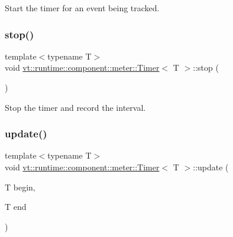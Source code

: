 Start the timer for an event being tracked. 

\mbox{\label{structvt_1_1runtime_1_1component_1_1meter_1_1_timer_a302a9e413a1188b3a30ece1905123249}} 
\subsubsection{\texorpdfstring{stop()}{stop()}}
{\footnotesize\ttfamily template$<$typename T$>$ \\
void \hyperlink{structvt_1_1runtime_1_1component_1_1meter_1_1_timer}{vt\+::runtime\+::component\+::meter\+::\+Timer}$<$ T $>$\+::stop (\begin{DoxyParamCaption}{ }\end{DoxyParamCaption})\hspace{0.3cm}{\ttfamily [inline]}}



Stop the timer and record the interval. 

\mbox{\label{structvt_1_1runtime_1_1component_1_1meter_1_1_timer_a04aed118756cd5e95ce1f264978effc2}} 
\subsubsection{\texorpdfstring{update()}{update()}}
{\footnotesize\ttfamily template$<$typename T$>$ \\
void \hyperlink{structvt_1_1runtime_1_1component_1_1meter_1_1_timer}{vt\+::runtime\+::component\+::meter\+::\+Timer}$<$ T $>$\+::update (\begin{DoxyParamCaption}\item[{T}]{begin,  }\item[{T}]{end }\end{DoxyParamCaption})\hspace{0.3cm}{\ttfamily [inline]}}



